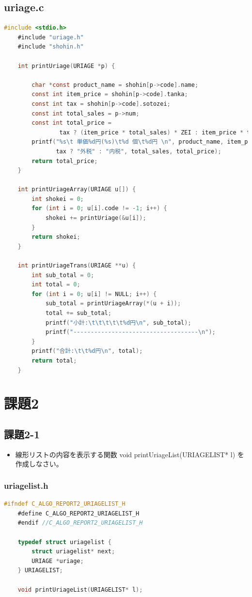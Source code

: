 \documentclass[10pt]{article}
\begin{document}
\subsection{uriage.c}
\begin{lstlisting}[language=C]
    #include <stdio.h>
    #include "uriage.h"
    #include "shohin.h"
    
    int printUriage(URIAGE *p) {
    
        char *const product_name = shohin[p->code].name;
        const int item_price = shohin[p->code].tanka;
        const int tax = shohin[p->code].sotozei;
        const int total_sales = p->num;
        const int total_price =
                tax ? (item_price * total_sales) * ZEI : item_price * total_sales;
        printf("%s\t 単価%d円(%s)\t%d 個\t%d円 \n", product_name, item_price,
               tax ? "外税" : "内税", total_sales, total_price);
        return total_price;
    }
    
    int printUriageArray(URIAGE u[]) {
        int shokei = 0;
        for (int i = 0; u[i].code != -1; i++) {
            shokei += printUriage(&u[i]);
        }
        return shokei;
    }
    
    int printUriageTrans(URIAGE **u) {
        int sub_total = 0;
        int total = 0;
        for (int i = 0; u[i] != NULL; i++) {
            sub_total = printUriageArray(*(u + i));
            total += sub_total;
            printf("小計:\t\t\t\t\t%d円\n", sub_total);
            printf("------------------------------------\n");
        }
        printf("合計:\t\t%d円\n", total);
        return total;
    }
\end{lstlisting}
\pagebreak

\section{課題2}

\subsection{課題2-1}

\begin{itemize}
    \item 線形リストの内容を表示する関数 void printUriageList(URIAGELIST* l) を作成しなさい。
\end{itemize}
\subsubsection{uriagelist.h}
\begin{lstlisting}[language=C]
    #ifndef C_ALGO_REPORT2_URIAGELIST_H
    #define C_ALGO_REPORT2_URIAGELIST_H
    #endif //C_ALGO_REPORT2_URIAGELIST_H
    
    typedef struct uriagelist {
        struct uriagelist* next;
        URIAGE *uriage;
    } URIAGELIST;
    
    void printUriageList(URIAGELIST* l);
\end{lstlisting}
\end{document}
